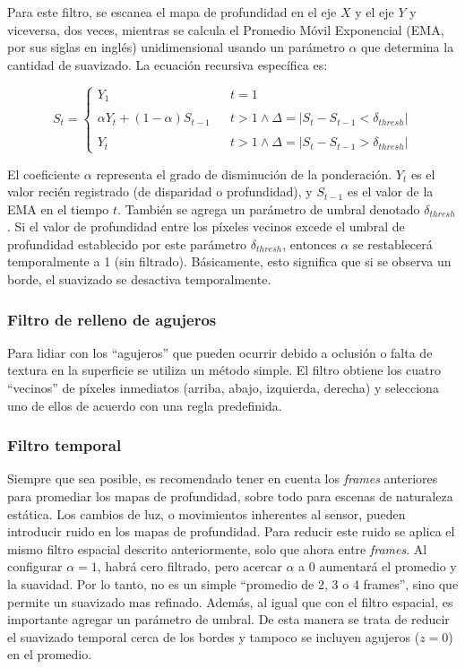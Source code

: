 Para este filtro, se escanea el mapa de profundidad en el eje $X$ y el eje $Y$ y viceversa, dos veces, mientras se calcula el Promedio Móvil Exponencial (EMA, por sus siglas en inglés) unidimensional usando un parámetro $\alpha$ que determina la cantidad de suavizado. La ecuación recursiva específica es:

\begin{equation}
	S_t = \left\{ \begin{array}{lcc}
		Y_1 & &  t = 1\\
		\\ \alpha Y_t + (1-\alpha)S_{t-1} &  &t > 1 \wedge \Delta=|S_t - S_{t-1} < \delta_{thresh}|\\
		\\ Y_t & & t > 1 \wedge \Delta=|S_t - S_{t-1} > \delta_{thresh}|
	\end{array}
	\right.
\end{equation}

El coeficiente $\alpha$ representa el grado de disminución de la ponderación. $Y_t$ es el valor recién registrado (de disparidad o profundidad), y $S_{t-1}$ es el valor de la EMA en el tiempo $t$. También se agrega un parámetro de umbral denotado $\delta_{thresh}$. Si el valor de profundidad entre los píxeles vecinos excede el umbral de profundidad establecido por este parámetro $\delta_{thresh}$, entonces $\alpha$ se restablecerá temporalmente a 1 (sin filtrado). Básicamente, esto significa que si se observa un borde, el suavizado se desactiva temporalmente.


\subsubsection{Filtro de relleno de agujeros}

Para lidiar con los ``agujeros'' que pueden ocurrir debido a oclusión o falta de textura en la superficie se utiliza un método simple. El filtro obtiene los cuatro ``vecinos'' de píxeles inmediatos (arriba, abajo, izquierda, derecha) y selecciona uno de ellos de acuerdo con una regla predefinida.

\subsubsection{Filtro temporal}

Siempre que sea posible, es recomendado tener en cuenta los \textit{frames} anteriores para promediar los mapas de profundidad, sobre todo para escenas de naturaleza estática. Los cambios de luz, o movimientos inherentes al sensor, pueden introducir ruido en los mapas de profundidad. Para reducir este ruido se aplica el mismo filtro espacial descrito anteriormente, solo que ahora entre \textit{frames}. Al configurar $\alpha = 1$, habrá cero filtrado, pero acercar $\alpha$ a 0 aumentará el promedio y la suavidad. Por lo tanto, no es un simple ``promedio de 2, 3 o 4 frames'', sino que permite un suavizado mas refinado. Además, al igual que con el filtro espacial, es importante agregar un parámetro de umbral. De esta manera se trata de reducir el suavizado temporal cerca de los bordes y tampoco se incluyen agujeros ($z=0$) en el promedio.

